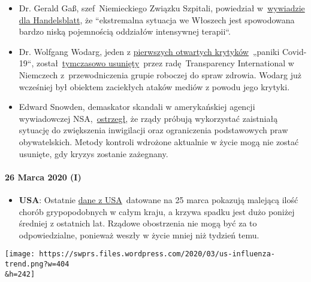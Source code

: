 \begin{itemize}
\item
  Dr. Gerald Gaß, szef~Niemieckiego Związku Szpitali, powiedział
  w~\href{https://www.handelsblatt.com/politik/deutschland/coronakrise-deutsche-krankenhausgesellschaft-wir-sind-besser-vorbereitet-als-italien/25651268.html}{wywiadzie
  dla Handelsblatt}, że ``ekstremalna sytuacja we Włoszech jest
  spowodowana bardzo niską pojemnością oddziałów intensywnej terapii``.
\item
  Dr. Wolfgang Wodarg, jeden z
  \href{https://www.youtube.com/watch?v=p_AyuhbnPOI}{pierwszych
  otwartych krytyków}~„paniki Covid-19``,
  został~\href{https://www.transparency.de/aktuelles/detail/article/in-eigener-sache-vorstand-beschliesst-ruhen-der-mitgliedschaft-von-wolfgang-wodarg-1/}{tymczasowo
  usunięty}~przez radę~Transparency International w Niemczech
  z~przewodniczenia grupie roboczej do spraw zdrowia. Wodarg już
  wcześniej był obiektem zaciekłych ataków mediów z powodu jego krytyki.
\item
  Edward Snowden, demaskator skandali w amerykańskiej agencji
  wywiadowczej
  NSA,~\href{https://www.cnet.com/news/snowden-warns-government-surveillance-amid-covid-19-could-be-long-lasting/}{ostrzegł},
  że rządy próbują wykorzystać zaistniałą sytuację do zwiększenia
  inwigilacji oraz ograniczenia podstawowych praw obywatelskich. Metody
  kontroli wdrożone aktualnie w życie mogą nie zostać usunięte, gdy
  kryzys zostanie zażegnany.
\end{itemize}

\hypertarget{26-marca-2020-i}{%
\paragraph{26 Marca 2020 (I)}\label{26-marca-2020-i}}

\begin{itemize}
\tightlist
\item
  \textbf{USA}: Ostatnie \href{https://healthweather.us/}{dane z
  USA}~datowane na 25 marca pokazują malejącą ilość chorób
  grypopodobnych w całym kraju, a krzywa spadku jest dużo poniżej
  średniej z ostatnich lat. Rządowe obostrzenia nie mogą być za to
  odpowiedzialne, ponieważ weszły w życie mniej niż tydzień temu.
\end{itemize}

\href{https://swprs.org/covid-19-hinweis-ii/us-influenza-trend/}{}

\texttt{[image: https://swprs.files.wordpress.com/2020/03/us-influenza-trend.png?w=404\\\&h=242]}

